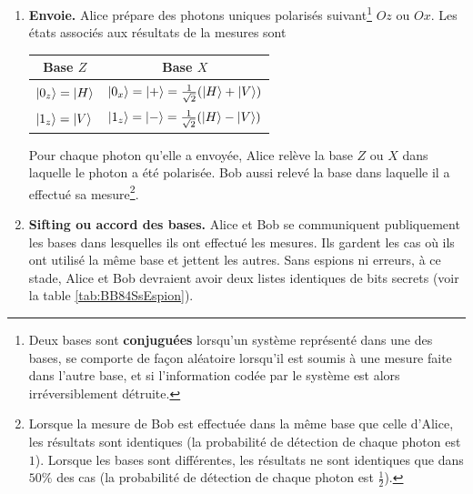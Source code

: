 \begin{enumerate}
\item \textbf{Envoie.} Alice prépare des photons uniques polarisés
suivant\footnote{Deux bases sont \textbf{conjuguées} lorsqu'un système
représenté dans une des bases, se comporte de façon aléatoire lorsqu'il est
soumis à une mesure faite dans l'autre base, et si l'information codée par le
système est alors irréversiblement détruite.} $Oz$ ou $Ox$. Les états associés
aux résultats de la mesures sont
\begin{center}
\begin{tabular}
[c]{|c|c|}\hline
\rowcolor[gray]{0.8}\textbf{Base }$Z$ & \textbf{Base }$X$\\\hline
\multicolumn{1}{|l|}{$\vert0_{z}\rangle=\vert H\rangle$} &
\multicolumn{1}{|l|}{$\vert0_{x}\rangle=\vert+\rangle=\frac{1}{\sqrt{2}}(\vert H\rangle+\vert V\rangle)$}
\\\hline
\multicolumn{1}{|l|}{$\vert1_{z}\rangle=\vert V\rangle$} &
\multicolumn{1}{|l|}{$\vert1_{z}\rangle=\vert-\rangle=\frac{1}{\sqrt{2}}(\vert H\rangle-\vert V\rangle)$}
\\\hline
\end{tabular}%
\end{center}

Pour chaque photon qu'elle a envoyée, Alice relève la base $Z$ ou $X$ dans
laquelle le photon a été polarisée. Bob aussi relevé la base dans laquelle il a
effectué sa mesure\footnote{Lorsque la mesure de Bob est effectuée dans la même
base que celle d'Alice, les résultats sont identiques (la probabilité de
détection de chaque photon est $1$). Lorsque les bases sont différentes, les
résultats ne sont identiques que dans $50\%$ des cas (la probabilité de
détection de chaque photon est $\frac{1}{2}$).}.

\item \textbf{Sifting ou accord des bases.} Alice et Bob se communiquent
publiquement les bases dans lesquelles ils ont effectué les mesures. Ils gardent
les cas où ils ont utilisé la même base et jettent les autres. Sans espions ni
erreurs, à ce stade, Alice et Bob devraient avoir deux listes identiques de bits
secrets (voir la table \ref{tab:BB84SsEspion}).


\end{enumerate}
